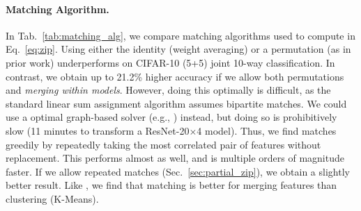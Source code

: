 \paragraph{Matching Algorithm.}
In Tab.~\ref{tab:matching_alg}, we compare matching algorithms used to compute  in Eq.~\ref{eq:zip}. Using either the identity (weight averaging) or a permutation (as in prior work) underperforms on CIFAR-10 (5+5) joint 10-way classification. 
In contrast, we obtain up to 21.2\% higher accuracy if we allow both permutations and \textit{merging within models}.
However, doing this optimally is difficult, as the standard linear sum assignment algorithm assumes bipartite matches. We could use a optimal graph-based solver (e.g., \citet{networkx}) instead, but doing so is prohibitively slow (11 minutes to transform a ResNet-20$\times$4 model). Thus, we find matches greedily by repeatedly taking the most correlated pair of features without replacement. This performs almost as well, and is multiple orders of magnitude faster. If we allow repeated matches (Sec.~\ref{sec:partial_zip}), we obtain a slightly better result.
Like \citet{bolya2022token}, we find that matching is better for merging features than clustering (K-Means).

% 

% 


